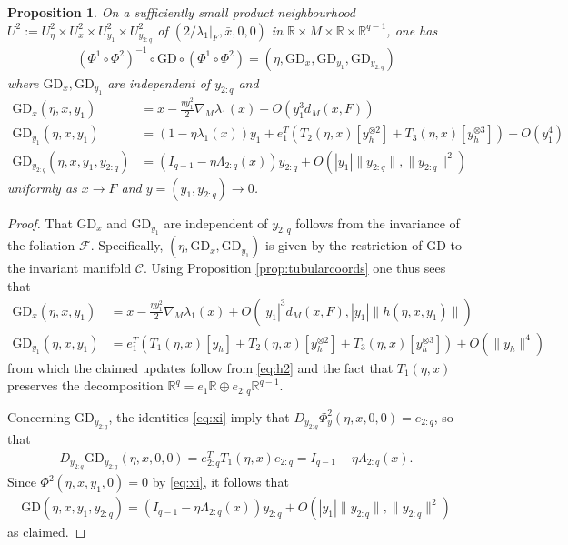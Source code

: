 \documentclass{article}
\newcommand{\RB}{\mathbb{R}}
\newcommand{\FC}{\mathcal{F}}
\newcommand{\CC}{\mathcal{C}}
\newcommand{\GD}{\mathrm{GD}}
\theoremstyle{plain}
\newtheorem{proposition}[theorem]{Proposition}
\theoremstyle{definition}
\theoremstyle{remark}
\begin{document}
\begin{proposition}
    On a sufficiently small product neighbourhood $U^2:=U^2_{\eta}\times U^2_x\times U^2_{y_1}\times U^2_{y_{2:q}}$ of $(2/\lambda_1|_F,\bar{x},0,0)$ in $\RB\times M\times\RB\times\RB^{q-1}$, one has
    \begin{align}
    (\Phi^1\circ\Phi^2)^{-1}\circ \GD\circ (\Phi^1\circ\Phi^2) = (\eta,\GD_x,\GD_{y_1},\GD_{y_{2:q}})
    \end{align}
    where $\GD_x,\GD_{y_1}$ are independent of $y_{2:q}$ and
    \begin{align}
    \GD_x(\eta,x,y_1) &= x-\frac{\eta y_1^2}{2}\nabla_M\lambda_1(x) + O(y_1^3d_M(x,F))\\\GD_{y_1}(\eta,x,y_1) &= (1-\eta\lambda_1(x))y_1+ e_1^T(T_2(\eta,x)[y_h^{\otimes 2}]+ T_3(\eta,x)[y_h^{\otimes 3}]) + O(y_1^4)\\\GD_{y_{2:q}}(\eta,x,y_1,y_{2:q})&= (I_{q-1}-\eta\Lambda_{2:q}(x))y_{2:q} + O(|y_1|\|y_{2:q}\|,\|y_{2:q}\|^2)
    \end{align}
    uniformly as $x\rightarrow F$ and $y = (y_1,y_{2:q})\rightarrow 0$.
\end{proposition}

\begin{proof}
    That $\GD_x$ and $\GD_{y_1}$ are independent of $y_{2:q}$ follows from the invariance of the foliation $\FC$. Specifically, $(\eta,\GD_x,\GD_{y_1})$ is given by the restriction of $\GD$ to the invariant manifold $\CC$. Using Proposition \ref{prop:tubularcoords} one thus sees that
    \begin{align}
    \GD_x(\eta,x,y_1) &= x-\frac{\eta y_1^2}{2}\nabla_M\lambda_1(x) + O(|y_1|^3d_M(x,F),|y_1|\|h(\eta,x,y_1)\|)\\ \GD_{y_1}(\eta,x,y_1) &= e_1^T(T_1(\eta,x)[y_h] + T_2(\eta,x)[y_h^{\otimes 2}] + T_3(\eta,x)[y_h^{\otimes 3}]) + O(\|y_h\|^4)
    \end{align}
    from which the claimed updates follow from \eqref{eq:h2} and the fact that $T_1(\eta,x)$ preserves the decomposition $\RB^q = e_1\RB\oplus e_{2:q}\RB^{q-1}$.
    
    Concerning $\GD_{y_{2:q}}$, the identities \eqref{eq:xi} imply that $D_{y_{2:q}}\Phi^2_y(\eta,x,0,0) = e_{2:q}$, so that
    \begin{align}
    D_{y_{2:q}}\GD_{y_{2:q}}(\eta,x,0,0) = e_{2:q}^TT_1(\eta,x)e_{2:q} = I_{q-1}-\eta\Lambda_{2:q}(x).
    \end{align}
    Since $\Phi^2(\eta,x,y_1,0) = 0$ by \eqref{eq:xi}, it follows that
    \begin{align}
    \GD(\eta,x,y_1,y_{2:q}) = (I_{q-1}-\eta\Lambda_{2:q}(x))y_{2:q} + O(|y_1|\|y_{2:q}\|,\|y_{2:q}\|^2)
    \end{align}
    as claimed.
\end{proof}
\end{document}
